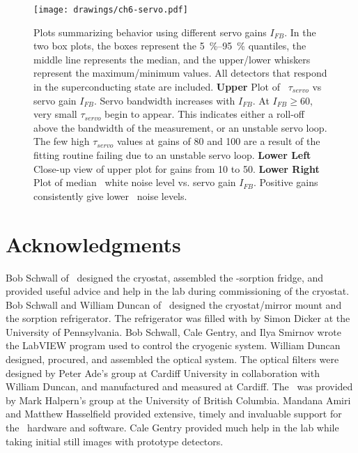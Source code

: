 \begin{figure}
\texttt{[image: drawings/ch6-servo.pdf]}
\caption[Plots summarizing behavior using different servo gains $I_{FB}$]{
  Plots summarizing behavior using different servo gains $I_{FB}$.
  In the two box plots, the boxes represent the \SIrange{5}{95}{\percent} quantiles, the middle line represents the median, and the upper/lower whiskers represent the maximum/minimum values.
All detectors that respond in the superconducting state are included.
\textbf{Upper} Plot of \SQUID\ $\tau_{servo}$ vs servo gain $I_{FB}$.
Servo bandwidth increases with $I_{FB}$.
At $I_{FB} \ge \num{60}$, very small $\tau_{servo}$ begin to appear. This indicates either a roll-off above the bandwidth of the measurement, or an unstable servo loop.
The few high $\tau_{servo}$ values at gains of 80 and 100 are a result of the fitting routine failing due to an unstable servo loop.
\textbf{Lower Left} Close-up view of upper plot for gains from 10 to 50.
\textbf{Lower Right} Plot of median \SQUID\ white noise level vs. servo gain $I_{FB}$. Positive gains consistently give lower \SQUID\ noise levels.
}
\label{fig:ch6-servo}
\end{figure}

\section{Acknowledgments}

Bob Schwall of \NIST\ designed the cryostat, assembled the -sorption fridge, and provided useful advice and help in the lab during commissioning of the cryostat.
Bob Schwall and William Duncan of \NIST\ designed the cryostat/mirror mount and the  sorption refrigerator.
The refrigerator was filled with  by Simon Dicker at the University of Pennsylvania.
Bob Schwall, Cale Gentry, and Ilya Smirnov wrote the LabVIEW program used to control the cryogenic system.
William Duncan designed, procured, and assembled the optical system.
The optical filters were designed by Peter Ade's group at Cardiff University in collaboration with William Duncan, and manufactured and measured at Cardiff.
The \MCE\ was provided by Mark Halpern's group at the University of British Columbia.
Mandana Amiri and Matthew Hasselfield provided extensive, timely and invaluable support for the \MCE\ hardware and software.
Cale Gentry provided much help in the lab while taking initial still images with prototype detectors.

